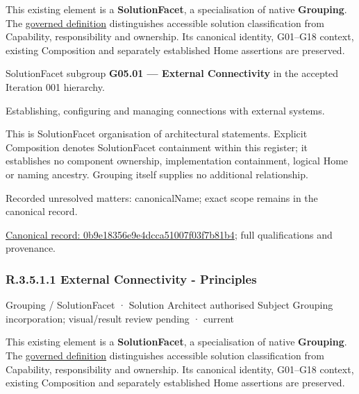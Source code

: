 This existing element is a \textbf{SolutionFacet}, a specialisation of native
\textbf{Grouping}. The \href{\detokenize{../../../../../../../governance/continuum-representation.md#solutionfacet-classification--1119-candidate}}{governed definition}
distinguishes accessible solution classification from Capability, responsibility
and ownership. Its canonical identity, G01–G18 context, existing Composition
and separately established Home assertions are preserved.



SolutionFacet subgroup \textbf{G05.01 — External Connectivity} in the accepted Iteration 001 hierarchy.



Establishing, configuring and managing connections with external systems.



This is SolutionFacet organisation of architectural statements. Explicit Composition denotes SolutionFacet containment within this register; it establishes no component ownership, implementation containment, logical Home or naming ancestry. Grouping itself supplies no additional relationship.


{\small Recorded unresolved matters: canonicalName; exact scope remains in the canonical record.}\par
{\footnotesize \href{../../../../../../../continuum/grouping/0b9e18356e9e4dcca51007f03f7b81b4.md}{Canonical record: 0b9e18356e9e4dcca51007f03f7b81b4}; full qualifications and provenance.}\par
\subsubsection*{R.3.5.1.1 External Connectivity - Principles}
\label{navigation:R.3.5.1.1}

\label{element:011207c2c69f42d7a5c9c7504ffbc951}
{\small Grouping / SolutionFacet · Solution Architect authorised Subject Grouping incorporation; visual/result review pending · current}\par

This existing element is a \textbf{SolutionFacet}, a specialisation of native
\textbf{Grouping}. The \href{\detokenize{../../../../../../../governance/continuum-representation.md#solutionfacet-classification--1119-candidate}}{governed definition}
distinguishes accessible solution classification from Capability, responsibility
and ownership. Its canonical identity, G01–G18 context, existing Composition
and separately established Home assertions are preserved.



